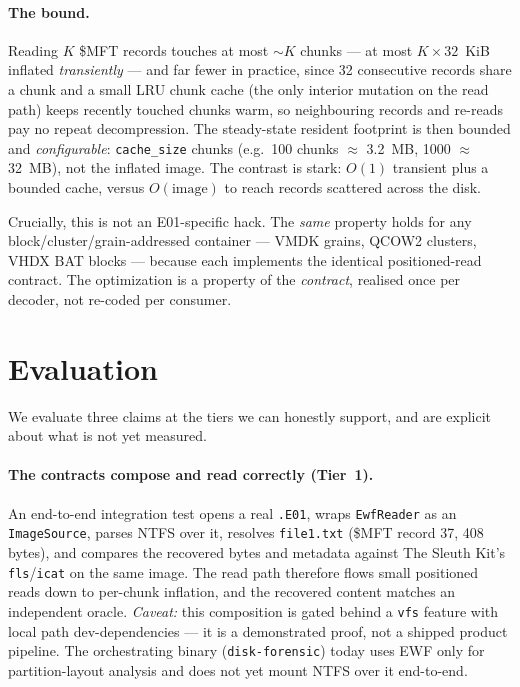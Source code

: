 \documentclass[10pt,twocolumn]{article}
\begin{document}
\paragraph{The bound.}
Reading $K$ \$MFT records touches at most $\sim K$ chunks --- at most
$K\times 32$~KiB inflated \emph{transiently} --- and far fewer in practice, since
32 consecutive records share a chunk and a small LRU chunk cache (the only
interior mutation on the read path) keeps recently touched chunks warm, so
neighbouring records and re-reads pay no repeat decompression. The steady-state
resident footprint is then bounded and \emph{configurable}: \texttt{cache\_size}
chunks (e.g.\ 100 chunks $\approx$ 3.2~MB, 1000 $\approx$ 32~MB), not the inflated
image. The contrast is stark: $O(1)$ transient plus a bounded cache, versus
$O(\text{image})$ to reach records scattered across the disk.

Crucially, this is not an E01-specific hack. The \emph{same} property holds for
any block/cluster/grain-addressed container --- VMDK grains, QCOW2 clusters, VHDX
BAT blocks --- because each implements the identical positioned-read contract.
The optimization is a property of the \emph{contract}, realised once per decoder,
not re-coded per consumer.

\section{Evaluation}\label{sec:eval}

We evaluate three claims at the tiers we can honestly support, and are explicit
about what is not yet measured.

\paragraph{The contracts compose and read correctly (Tier~1).}
An end-to-end integration test opens a real \texttt{.E01}, wraps
\texttt{EwfReader} as an \texttt{ImageSource}, parses NTFS over it, resolves
\texttt{file1.txt} (\$MFT record 37, 408 bytes), and compares the recovered bytes
and metadata against The Sleuth Kit's \texttt{fls}/\texttt{icat} on the same
image. The read path therefore flows small positioned reads down to per-chunk
inflation, and the recovered content matches an independent oracle. \emph{Caveat:}
this composition is gated behind a \texttt{vfs} feature with local path
dev-dependencies --- it is a demonstrated proof, not a shipped product pipeline.
The orchestrating binary (\texttt{disk-forensic}) today uses EWF only for
partition-layout analysis and does not yet mount NTFS over it end-to-end.
\end{document}
